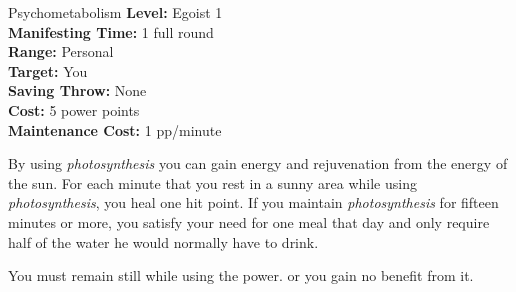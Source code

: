 {Psychometabolism}
{
	\textbf{Level:}
	Egoist 1\\
	\textbf{Manifesting Time:}
	1 full round\\
	\textbf{Range:}
	Personal\\
	\textbf{Target:}
	You\\
	\textbf{Saving Throw:}
	None\\
	\textbf{Cost:}
	5 power points\\
	\textbf{Maintenance Cost:}
	1 pp/minute\\
}
{
	By using \emph{photosynthesis} you can gain energy and rejuvenation from the energy of the sun. For each minute that you rest in a sunny area while using \emph{photosynthesis}, you heal one hit point. If you maintain \emph{photosynthesis} for fifteen minutes or more, you satisfy your need for one meal that day and only require half of the water he would normally have to drink.

	You must remain still while using the power. or you gain no benefit from it.
}